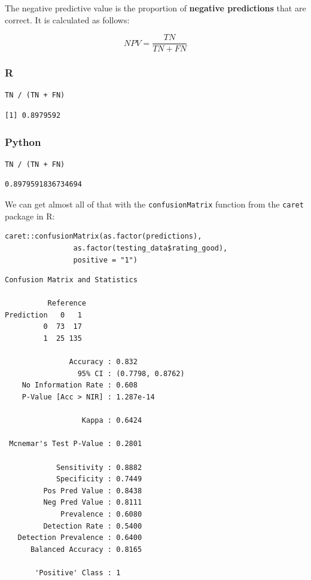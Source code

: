 \documentclass[
  letterpaper,
]{krantz}
\begin{document}
The negative predictive value is the proportion of \textbf{negative
predictions} that are correct. It is calculated as follows:

\[NPV = \frac{TN}{TN + FN}\]

\subsubsection{R}

\begin{verbatim}
TN / (TN + FN)
\end{verbatim}

\begin{verbatim}
[1] 0.8979592
\end{verbatim}

\subsubsection{Python}

\begin{verbatim}
TN / (TN + FN)
\end{verbatim}

\begin{verbatim}
0.8979591836734694
\end{verbatim}

We can get almost all of that with the \texttt{confusionMatrix} function
from the \texttt{caret} package in R:

\begin{verbatim}
caret::confusionMatrix(as.factor(predictions), 
                as.factor(testing_data$rating_good), 
                positive = "1")
\end{verbatim}

\begin{verbatim}
Confusion Matrix and Statistics

          Reference
Prediction   0   1
         0  73  17
         1  25 135
                                          
               Accuracy : 0.832           
                 95% CI : (0.7798, 0.8762)
    No Information Rate : 0.608           
    P-Value [Acc > NIR] : 1.287e-14       
                                          
                  Kappa : 0.6424          
                                          
 Mcnemar's Test P-Value : 0.2801          
                                          
            Sensitivity : 0.8882          
            Specificity : 0.7449          
         Pos Pred Value : 0.8438          
         Neg Pred Value : 0.8111          
             Prevalence : 0.6080          
         Detection Rate : 0.5400          
   Detection Prevalence : 0.6400          
      Balanced Accuracy : 0.8165          
                                          
       'Positive' Class : 1               
                                          
\end{verbatim}
\end{document}
